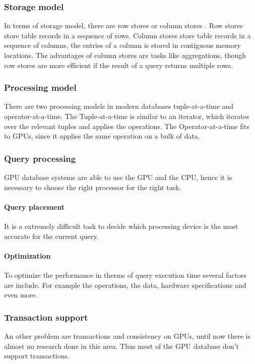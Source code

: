 \subsubsection{Storage model}
In terms of storage model, there are row stores or column stores \cite{abadi2008column}.
Row stores store table records in a sequence of rows.
Column stores store table records in a sequence of columns, the entries of a column is stored in contiguous memory locations.
The advantages of column stores are tasks like aggregations, though row stores are more efficient if the result of a query returns multiple rows.


\subsubsection{Processing model}
There are two processing models in modern databases tuple-at-a-time and operator-at-a-time.
The Tuple-at-a-time is similar to an iterator, which iterates over the relevant tuples and applies the operations.
The Operator-at-a-time fits to GPUs, since it applies the same operation on a bulk of data.

\subsubsection{Query processing}
GPU database systems are able to use the GPU and the CPU, hence it is necessary to choose the right processor for the right task.
\paragraph{Query placement} It is a extremely difficult task to decide which processing device is the most accurate for the current query.
\paragraph{Optimization} To optimize the performance in therms of query execution time several factors are include.
For example the operations, the data, hardware specifications and even more.

\subsubsection{Transaction support}
An other problem are transactions and consistency on GPUs, until now there is almost no research done in this area.
Thus most of the GPU database don't support transactions.

